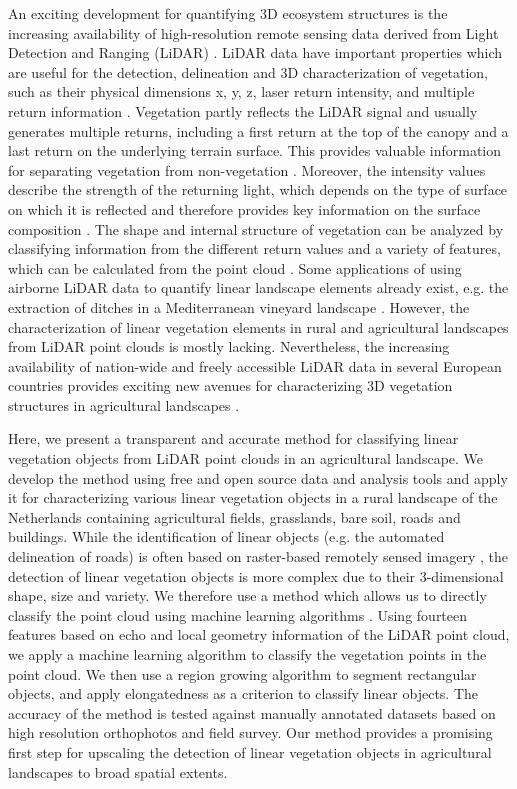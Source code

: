 An exciting development for quantifying 3D ecosystem structures is the increasing availability of high-resolution remote sensing data derived from Light Detection and Ranging (LiDAR) \citep{lim2003lidar}. LiDAR data have important properties which are useful for the detection, delineation and 3D characterization of vegetation, such as their physical dimensions x, y, z, laser return intensity, and multiple return information \citep{lefsky2002lidar, eitel2016beyond}. Vegetation partly reflects the LiDAR signal and usually generates multiple returns, including a first return at the top of the canopy and a last return on the underlying terrain surface. This provides valuable information for separating vegetation from non-vegetation \citep{lim2003lidar}. Moreover, the intensity values describe the strength of the returning light, which depends on the type of surface on which it is reflected and therefore provides key information on the surface composition \citep{song2002assessing}. The shape and internal structure of vegetation can be analyzed by classifying information from the different return values and a variety of features, which can be calculated from the point cloud \citep{lim2003lidar, weinmann2015semantic}. Some applications of using airborne LiDAR data to quantify linear landscape elements already exist, e.g. the extraction of ditches in a Mediterranean vineyard landscape \citep{bailly2008agrarian}. However, the characterization of linear vegetation elements in rural and agricultural landscapes from LiDAR point clouds is mostly lacking. Nevertheless, the increasing availability of nation-wide and freely accessible LiDAR data in several European countries provides exciting new avenues for characterizing 3D vegetation structures in agricultural landscapes \citep{kissling2017eecolidar}.

Here, we present a transparent and accurate method for classifying linear vegetation objects from LiDAR point clouds in an agricultural landscape. We develop the method using free and open source data and analysis tools and apply it for characterizing various linear vegetation objects in a rural landscape of the Netherlands containing agricultural fields, grasslands, bare soil, roads and buildings. While the identification of linear objects (e.g. the automated delineation of roads) is often based on raster-based remotely sensed imagery \citep{quackenbush2004review}, the detection of linear vegetation objects is more complex due to their 3-dimensional shape, size and variety. We therefore use a method which allows us to directly classify the point cloud using machine learning algorithms \citep{yan2015urban}. Using fourteen features based on echo and local geometry information of the LiDAR point cloud, we apply a machine learning algorithm to classify the vegetation points in the point cloud. We then use a region growing algorithm to segment rectangular objects, and apply elongatedness as a criterion to classify linear objects. The accuracy of the method is tested against manually annotated datasets based on high resolution orthophotos and field survey. Our method provides a promising first step for upscaling the detection of linear vegetation objects in agricultural landscapes to broad spatial extents.